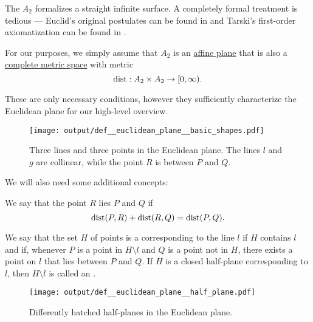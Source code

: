 \begin{definition}\label{def:euclidean_plane}\mimprovised
  The  \( A_2 \) formalizes a straight infinite surface. A completely formal treatment is tedious --- Euclid's original postulates can be found in \cite[7]{Fitzpatrick2008} and Tarski's first-order axiomatization can be found in \cite{Tarski1959}.

  For our purposes, we simply assume that \( A_2 \) is an \hyperref[def:affine_plane]{affine plane} that is also a \hyperref[def:complete_metric_space]{complete metric space} with metric
  \begin{equation*}
    \operatorname{dist}: A_2 \times A_2 \to [0, \infty).
  \end{equation*}

  These are only necessary conditions, however they sufficiently characterize the Euclidean plane for our high-level overview.

  \begin{figure}[!ht]
    \centering
    \texttt{[image: output/def\_\_euclidean\_plane\_\_basic\_shapes.pdf]}
    \caption{Three lines and three points in the Euclidean plane. The lines \( l \) and \( g \) are collinear, while the point \( R \) is between \( P \) and \( Q \).}\label{fig:def:euclidean_plane/basic_shapes}
  \end{figure}

  We will also need some additional concepts:
  \begin{thmenum}
     We say that the point \( R \) lies  \( P \) and \( Q \) if
    \begin{equation*}
      \operatorname{dist}(P, R) + \operatorname{dist}(R, Q) = \operatorname{dist}(P, Q).
    \end{equation*}

     We say that the set \( H \) of points is a  corresponding to the line \( l \) if \( H \) contains \( l \) and if, whenever \( P \) is a point in \( H \setminus l \) and \( Q \) is a point not in \( H \), there exists a point on \( l \) that lies between \( P \) and \( Q \). If \( H \) is a closed half-plane corresponding to \( l \), then \( H \setminus l \) is called an .

    \begin{figure}[!ht]
      \centering
      \texttt{[image: output/def\_\_euclidean\_plane\_\_half\_plane.pdf]}
      \caption{Differently hatched half-planes in the Euclidean plane.}\label{fig:def:euclidean_plane/half_plane}
    \end{figure}


\end{thmenum}
\end{definition}
